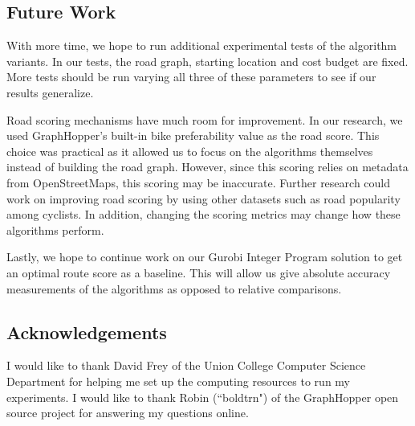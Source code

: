 \documentclass[honors]{union-cs-thesis}
\begin{document}
\subsection{Future Work}
With more time, we hope to run additional experimental tests of the algorithm variants. In our tests, the road graph, starting location and cost budget are fixed. More tests should be run varying all three of these parameters to see if our results generalize.  

Road scoring mechanisms have much room for improvement. In our research, we used GraphHopper's built-in bike preferability value as the road score. This choice was practical as it allowed us to focus on the algorithms themselves instead of building the road graph. However, since this scoring relies on metadata from OpenStreetMaps, this scoring may be inaccurate. Further research could work on improving road scoring by using other datasets such as road popularity among cyclists. In addition, changing the scoring metrics may change how these algorithms perform.

Lastly, we hope to continue work on our Gurobi Integer Program solution to get an optimal route score as a baseline. This will allow us give absolute accuracy measurements of the algorithms as opposed to relative comparisons.

\subsection{Acknowledgements}
I would like to thank David Frey of the Union College Computer Science Department for helping me set up the computing resources to run my experiments. I would like to thank Robin (``boldtrn") of the GraphHopper open source project for answering my questions online.   
\end{document}
